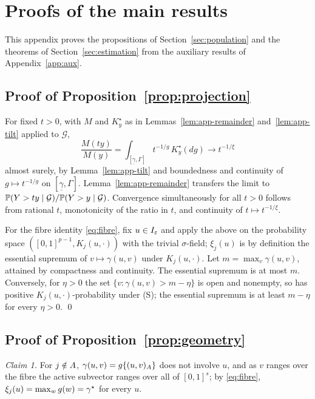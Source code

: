 \section{Proofs of the main results}
\label{app:proofs}
\renewcommand{\theequation}{B.\arabic{equation}}
\setcounter{equation}{0}

This appendix proves the propositions of Section~\ref{sec:population}
and the theorems of Section~\ref{sec:estimation} from the auxiliary
results of Appendix~\ref{app:aux}.

\subsection{Proof of Proposition~\ref{prop:projection}}

For fixed $t>0$, with $M$ and $K_y^\star$ as in
Lemmas~\ref{lem:app-remainder} and~\ref{lem:app-tilt} applied to
$\mathcal G$,
\[
 \frac{M(ty)}{M(y)}
 =\int_{[\underline\gamma,\Gamma]}t^{-1/g}\,K_y^\star(dg)
 \longrightarrow t^{-1/\xi}
\]
almost surely, by Lemma~\ref{lem:app-tilt} and boundedness and continuity
of $g\mapsto t^{-1/g}$ on $[\underline\gamma,\Gamma]$.
Lemma~\ref{lem:app-remainder} transfers the limit to
$\mathbb P(Y>ty\mid\mathcal G)/\mathbb P(Y>y\mid\mathcal G)$.  Convergence
simultaneously for all $t>0$ follows from rational $t$, monotonicity of
the ratio in $t$, and continuity of $t\mapsto t^{-1/\xi}$.

For the fibre identity \eqref{eq:fibre}, fix $u\in I_\varepsilon$ and apply the above
on the probability space $([0,1]^{p-1},K_j(u,\cdot))$ with the trivial
$\sigma$-field; $\xi_j(u)$ is by definition the essential supremum of
$v\mapsto\gamma(u,v)$ under $K_j(u,\cdot)$.  Let
$m=\max_v\gamma(u,v)$, attained by compactness and continuity.  The
essential supremum is at most $m$.  Conversely, for $\eta>0$ the set
$\{v:\gamma(u,v)>m-\eta\}$ is open and nonempty, so has positive
$K_j(u,\cdot)$-probability under (S); the essential supremum is at least
$m-\eta$ for every $\eta>0$.  \qed

\subsection{Proof of Proposition~\ref{prop:geometry}}

\emph{Claim 1.}  For $j\notin A$, $\gamma(u,v)=g\{(u,v)_{A}\}$ does not
involve $u$, and as $v$ ranges over the fibre the active subvector ranges
over all of $[0,1]^{s}$; by \eqref{eq:fibre},
$\xi_j(u)=\max_{w}g(w)=\gamma^\star$ for every $u$.

